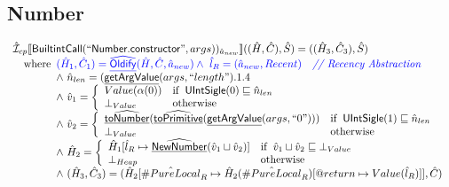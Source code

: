 \documentclass{article}
\makeatletter
\newcommand{\SF}[1]{\mbox{\textsf{#1}}}
\newcommand{\comment}[1]{\textit{#1}}
\newcommand{\wherec}[1]{{\rm where}\begin{array}[t]{l}#1\end{array}}
\newcommand{\ifc}[1]{{\rm if}\begin{array}[t]{l}#1\end{array}}
\newcommand{\owc}{{\rm otherwise}}
\newcommand{\aI}{\hat{\mathcal{I}}}
\newcommand{\lbr}{\llbracket}
\newcommand{\rbr}{\rrbracket}
\newcommand{\hf}[1]{\underline{\sf #1}}
\newcommand{\ahf}[1]{\widehat{\underline{\sf #1}}}
\newcommand{\varprop}[1]{@#1}
\newcommand{\avarloc}[1]{\hat{\##1}}
\def\inblue{\color{blue}}
\def\inblue{\color{blue}}
\makeatother
\begin{document}
\subsection{Number}
\[
\begin{array}{l}
\aI _{cp}\lbr \SF{BuiltintCall}(``\SF{Number.constructor}",args))_{\hat{a}_{new}}\rbr((\hat{H},\hat{C}), \hat{S})
  = ((\hat{H}_3, \hat{C}_3), \hat{S})\\
\quad\wherec{
  \inblue (\hat{H}_1, \hat{C}_1) = \ahf{Oldify}(\hat{H}, \hat{C}, \hat{a}_{new})
  \land\ \inblue\hat{l}_{R} = (\hat{a}_{new}, Recent)
    \quad\comment{{\inblue // Recency Abstraction}}\\
  \land\ \hat{n}_{len} = (\hf{getArgValue}(args, ``length").1.4\\
  \land\ \hat{v}_1 = \left\{\begin{array}{ll}
      Value(\alpha(0)) & \ifc{\SF{UIntSigle}(0) \sqsubseteq \hat{n}_{len}}\\
      \bot_{Value} & \owc
    \end{array}\right.\\
  \land\ \hat{v}_2 = \left\{\begin{array}{ll}
      \ahf{toNumber}(\ahf{toPrimitive}(\hf{getArgValue}(args, ``0"))) & \ifc{\SF{UIntSigle}(1) \sqsubseteq \hat{n}_{len}}\\
      \bot_{Value} & \owc
    \end{array}\right.\\
  \land\ \hat{H}_2 = \left\{\begin{array}{ll}
       \hat{H}_1[\hat{l}_R \mapsto \ahf{NewNumber}(\hat{v}_1 \sqcup \hat{v}_2)] & \ifc{\hat{v}_1 \sqcup \hat{v}_2 \sqsubseteq \bot_{Value}}\\
      \bot_{Heap} & \owc
    \end{array}\right.\\
 \land\ (\hat{H}_3, \hat{C}_3) = (\hat{H}_2[\avarloc{PureLocal}_R \mapsto \hat{H}_2(\avarloc{PureLocal}_R)[\varprop{return} \mapsto Value(\hat{l}_R)]], \hat{C})\\
  }\\
\end{array}
\]
\end{document}
